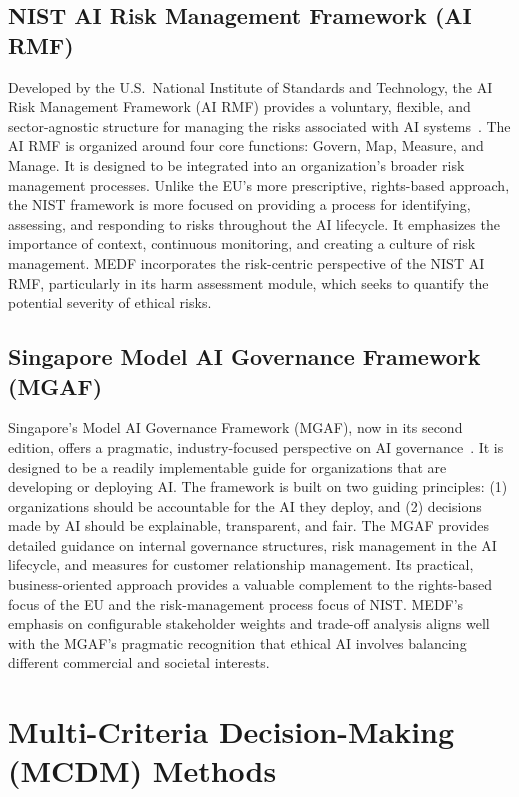 \subsection{NIST AI Risk Management Framework (AI RMF)}
\label{sec:nist}

Developed by the U.S.\ National Institute of Standards and Technology, the AI Risk Management Framework (AI RMF) provides a voluntary, flexible, and sector-agnostic structure for managing the risks associated with AI systems~\cite{nist2023rmf}. The AI RMF is organized around four core functions: Govern, Map, Measure, and Manage. It is designed to be integrated into an organization's broader risk management processes. Unlike the EU's more prescriptive, rights-based approach, the NIST framework is more focused on providing a process for identifying, assessing, and responding to risks throughout the AI lifecycle. It emphasizes the importance of context, continuous monitoring, and creating a culture of risk management. MEDF incorporates the risk-centric perspective of the NIST AI RMF, particularly in its harm assessment module, which seeks to quantify the potential severity of ethical risks.

\subsection{Singapore Model AI Governance Framework (MGAF)}
\label{sec:mgaf}

Singapore's Model AI Governance Framework (MGAF), now in its second edition, offers a pragmatic, industry-focused perspective on AI governance~\cite{pdpc2020mgaf}. It is designed to be a readily implementable guide for organizations that are developing or deploying AI. The framework is built on two guiding principles: (1) organizations should be accountable for the AI they deploy, and (2) decisions made by AI should be explainable, transparent, and fair. The MGAF provides detailed guidance on internal governance structures, risk management in the AI lifecycle, and measures for customer relationship management. Its practical, business-oriented approach provides a valuable complement to the rights-based focus of the EU and the risk-management process focus of NIST. MEDF's emphasis on configurable stakeholder weights and trade-off analysis aligns well with the MGAF's pragmatic recognition that ethical AI involves balancing different commercial and societal interests.

\section{Multi-Criteria Decision-Making (MCDM) Methods}
\label{sec:mcdm}

